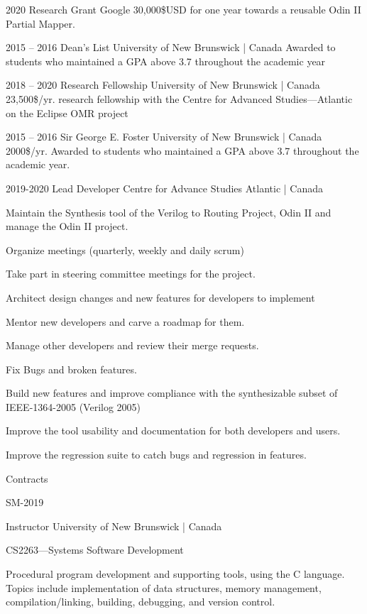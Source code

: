 \documentclass{developercv} %
\begin{document}

\entrys
{2020}
{Research Grant}
{Google}
{30,000\$USD for one year towards a reusable Odin II Partial Mapper.\footnotemark}


\entrys
{2015 -- 2016}
{Dean's List}
{University of New Brunswick | Canada}
{Awarded to students who maintained a GPA above 3.7 throughout the academic year}


\entrys
{2018 -- 2020}
{Research Fellowship}
{University of New Brunswick | Canada}
{23,500\$/yr. research fellowship  with the Centre for Advanced Studies---Atlantic on the Eclipse OMR project}

\entrys
{2015 -- 2016}
{Sir George E. Foster}
{University of New Brunswick | Canada}
{2000\$/yr. Awarded to students who maintained a GPA above 3.7 throughout the academic year.}


\entrys
{2019-2020}
{Lead Developer}
{Centre for Advance Studies Atlantic | Canada}{
	Maintain the Synthesis tool of the Verilog to Routing Project, Odin II and manage the Odin II project.
	\begin{tightemize}
		\item Organize meetings (quarterly, weekly and daily scrum)
		\item Take part in steering committee meetings for the project.
		\item Architect design changes and new features for developers to implement
		\item Mentor new developers and carve a roadmap for them.
		\item Manage other developers and review their merge requests.
		\item Fix Bugs and broken features.
		\item Build new features and improve compliance with the synthesizable subset of IEEE-1364-2005 (Verilog 2005)
		\item Improve the tool usability and documentation for both developers and users.
		\item Improve the regression suite to catch bugs and regression in features.
	\end{tightemize}
}

\entrys
{
	Contracts\\
	\begin{tightemize}
		\item[] {\footnotesize SM-2019}
	\end{tightemize}
}
{Instructor}
{University of New Brunswick | Canada}
{
	\begin{tightemize}
		\item CS2263---Systems Software Development
		\begin{smallQuote}
			Procedural program development and supporting tools, using the C language.
			Topics include implementation of data structures, memory management, compilation/linking, building, debugging, and version control.
		\end{smallQuote}
	\end{tightemize}

}
\end{document}
